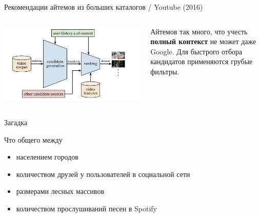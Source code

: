 \documentclass[11pt,aspectratio=169,handout]{beamer}
\begin{document}
\begin{frame}{Рекомендации айтемов из больших каталогов / Youtube (2016) \cite{YTBE}}
\begin{columns}
\begin{column}{0.6\textwidth}
   \begin{center}
		\includegraphics[scale=0.25]{images/youtube.png}
   \end{center}
\end{column}
\begin{column}{0.35\textwidth}
   \begin{small}
    \begin{tcolorbox}[colback=info!5,colframe=info!80,title=]
    Айтемов так много, что учесть {\bf полный контекст} не может даже Google. Для быстрого отбора кандидатов применяются грубые фильтры.
    \end{tcolorbox}
    \end{small}
\end{column}
\end{columns}

\end{frame}

\begin{frame}{Загадка}

Что общего между
\begin{itemize}
\item населением городов
\item количеством друзей у пользователей в социальной сети
\item размерами лесных массивов
\item количеством прослушиваний песен в Spotify
\end{itemize}

\end{frame}
\end{document}
